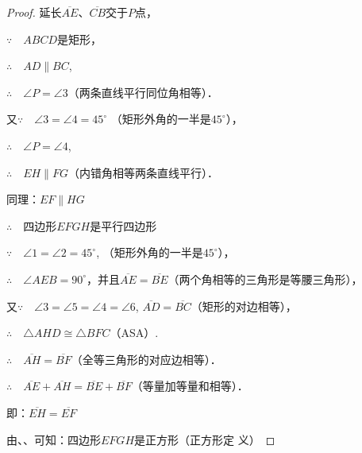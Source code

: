 \begin{proof}
延长$\overline{AE}$、$\overline{CB}$交于$P$点，

$\because\quad ABCD$是矩形，

$\therefore\quad AD\parallel BC$,

$\therefore\quad \angle P=\angle 3$（两条直线平行同位角相等）．

又$\because\quad \angle 3=\angle 4=45^{\circ}$ （矩形外角的一半是$45^{\circ}$），

$\therefore\quad \angle P=\angle 4$,

$\therefore\quad EH\parallel FG$（内错角相等两条直线平行）．

同理：$EF\parallel HG$

$\therefore\quad $四边形$EFGH$是平行四边形\quad {}

$\because\quad \angle 1=\angle 2=45^{\circ}$, （矩形外角的一半是$45^{\circ}$），

$\therefore\quad \angle AEB=90^{\circ}$\quad {}，并且$\overline{AE}=\overline{BE}$（两个角相等的三角形是等腰三角形），

又$\because\quad \angle 3=\angle 5=\angle 4=\angle 6$, $\overline{AD}=\overline{BC}$（矩形的对边相等），

$\therefore\quad \triangle AHD\cong \triangle BFC$（ASA）.

$\therefore\quad \overline{AH}=\overline{BF}$（全等三角形的对应边相等）．

$\therefore\quad \overline{AE}+\overline{AH}=\overline{BE}+\overline{BF}$（等量加等量和相等）．    

即：$\overline{EH}=\overline{EF}$\quad {}

由、、可知：四边形$EFGH$是正方形（正方形定
义）
\end{proof}

